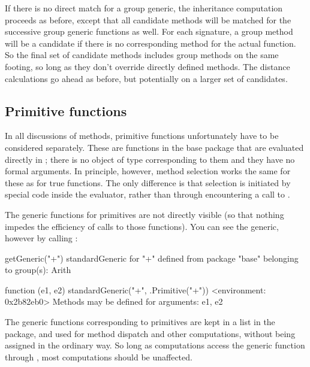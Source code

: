 \documentclass[11pt]{article}
\begin{document}
If there is no direct match for a group generic, the inheritance computation proceeds as before, except that all candidate methods will be matched for the successive group generic functions as well.
For each signature, a group method will be a candidate if there is no corresponding method for the actual function.
So the final set of candidate methods includes group methods on the same footing, so long as they don't override directly defined methods.
The distance calculations go ahead as before, but potentially on a larger set of candidates.

\subsection*{Primitive functions}
\label{sec:primitive-functions}

In all discussions of methods, primitive functions unfortunately have to be considered separately.
These are functions in the base package that are evaluated directly in \C{}; there is no object of type  corresponding to them and they have no formal arguments.
In principle, however, method selection works the same for these as for true functions.
The only difference is that selection is initiated by special code inside the \R{} evaluator, rather than through encountering a call to .

The generic functions for primitives are not directly visible (so that nothing impedes the efficiency of calls to those functions).
You can see the generic, however by calling :
\begin{Example}
\SPrompt{}getGeneric("+")
standardGeneric for "+" defined from package "base"
  belonging to group(s): Arith 

function (e1, e2) 
standardGeneric("+", .Primitive("+"))
<environment: 0x2b82eb0>
Methods may be defined for arguments: e1, e2 
\end{Example}
The generic functions corresponding to primitives are kept in a list in the  package, and used for method dispatch and other computations, without being assigned in the ordinary way.
So long as computations access the generic function through , most computations should be unaffected.
\end{document}
